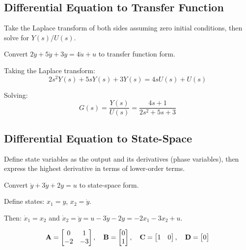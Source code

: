 \subsection{Differential Equation to Transfer Function}

Take the Laplace transform of both sides assuming zero initial conditions, then solve for $Y(s)/U(s)$.

\begin{examplebox}[title=Example 4.7: ODE to Transfer Function]
Convert $2\ddot{y} + 5\dot{y} + 3y = 4\dot{u} + u$ to transfer function form.

Taking the Laplace transform:
\begin{equation}
2s^2Y(s) + 5sY(s) + 3Y(s) = 4sU(s) + U(s)
\end{equation}

Solving:
\begin{equation}
G(s) = \frac{Y(s)}{U(s)} = \frac{4s + 1}{2s^2 + 5s + 3}
\end{equation}
\end{examplebox}

\subsection{Differential Equation to State-Space}

Define state variables as the output and its derivatives (phase variables), then express the highest derivative in terms of lower-order terms.

\begin{examplebox}[title=Example 4.8: ODE to State-Space (No Input Derivatives)]
Convert $\ddot{y} + 3\dot{y} + 2y = u$ to state-space form.

Define states: $x_1 = y$, $x_2 = \dot{y}$.

Then: $\dot{x}_1 = x_2$ and $\dot{x}_2 = \ddot{y} = u - 3\dot{y} - 2y = -2x_1 - 3x_2 + u$.

\begin{equation}
\mathbf{A} = \begin{bmatrix} 0 & 1 \\ -2 & -3 \end{bmatrix}, \quad
\mathbf{B} = \begin{bmatrix} 0 \\ 1 \end{bmatrix}, \quad
\mathbf{C} = \begin{bmatrix} 1 & 0 \end{bmatrix}, \quad
\mathbf{D} = \begin{bmatrix} 0 \end{bmatrix}
\end{equation}
\end{examplebox}

